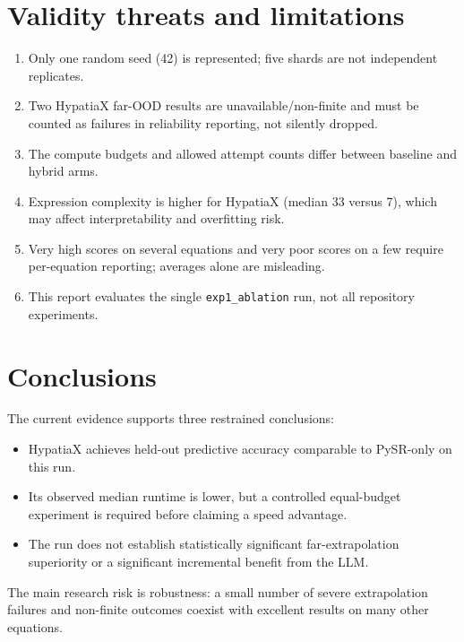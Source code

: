 \documentclass[11pt,a4paper]{article}
\begin{document}
\section{Validity threats and limitations}
\begin{enumerate}[leftmargin=*]
\item Only one random seed (42) is represented; five shards are not independent replicates.
\item Two HypatiaX far-OOD results are unavailable/non-finite and must be counted as failures in reliability reporting, not silently dropped.
\item The compute budgets and allowed attempt counts differ between baseline and hybrid arms.
\item Expression complexity is higher for HypatiaX (median 33 versus 7), which may affect interpretability and overfitting risk.
\item Very high scores on several equations and very poor scores on a few require per-equation reporting; averages alone are misleading.
\item This report evaluates the single \texttt{exp1\_ablation} run, not all repository experiments.
\end{enumerate}
\section{Conclusions}
The current evidence supports three restrained conclusions:
\begin{itemize}[leftmargin=*]
\item HypatiaX achieves held-out predictive accuracy comparable to PySR-only on this run.
\item Its observed median runtime is lower, but a controlled equal-budget experiment is required before claiming a speed advantage.
\item The run does not establish statistically significant far-extrapolation superiority or a significant incremental benefit from the LLM.
\end{itemize}
The main research risk is robustness: a small number of severe extrapolation failures and non-finite outcomes coexist with excellent results on many other equations.
\end{document}
